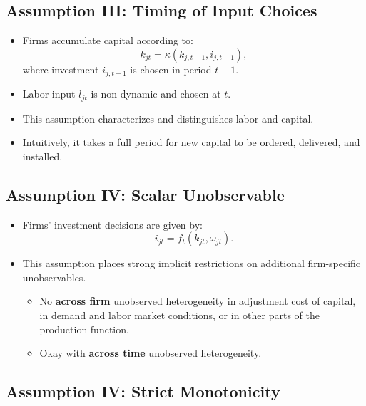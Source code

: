 \documentclass[
]{book}
\providecommand{\tightlist}{%
  \setlength{\itemsep}{0pt}\setlength{\parskip}{0pt}}
\begin{document}
\hypertarget{assumption-iii-timing-of-input-choices}{%
\subsection{Assumption III: Timing of Input Choices}\label{assumption-iii-timing-of-input-choices}}

\begin{itemize}
\tightlist
\item
  Firms accumulate capital according to:
  \begin{equation}
  k_{jt} = \kappa(k_{j, t - 1}, i_{j, t - 1}),
  \end{equation}
  where investment \(i_{j, t - 1}\) is chosen in period \(t - 1\).
\item
  Labor input \(l_{jt}\) is non-dynamic and chosen at \(t\).
\item
  This assumption characterizes and distinguishes labor and capital.
\item
  Intuitively, it takes a full period for new capital to be ordered, delivered, and installed.
\end{itemize}

\hypertarget{assumption-iv-scalar-unobservable}{%
\subsection{Assumption IV: Scalar Unobservable}\label{assumption-iv-scalar-unobservable}}

\begin{itemize}
\tightlist
\item
  Firms' investment decisions are given by:
  \begin{equation}
  i_{jt} = f_t(k_{jt}, \omega_{jt}).
  \end{equation}
\item
  This assumption places strong implicit restrictions on additional firm-specific unobservables.

  \begin{itemize}
  \tightlist
  \item
    No \textbf{across firm} unobserved heterogeneity in adjustment cost of capital, in demand and labor market conditions, or in other parts of the production function.
  \item
    Okay with \textbf{across time} unobserved heterogeneity.
  \end{itemize}
\end{itemize}

\hypertarget{assumption-iv-strict-monotonicity}{%
\subsection{Assumption IV: Strict Monotonicity}\label{assumption-iv-strict-monotonicity}}
\end{document}
